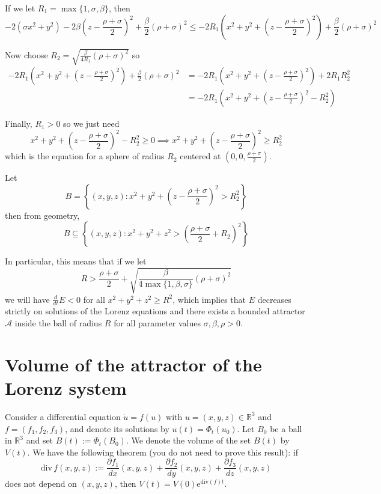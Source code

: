 \documentclass[12pt]{article}
\newcommand{\R}{\mathbb{R}}
\newcommand{\sub}{\subseteq}
\begin{document}
If we let $R_1 = \max\{1, \sigma, \beta\}$, then
\[-2(\sigma x^2 + y^2) -2\beta \left(z - \frac{\rho +\sigma}{2}\right)^2 + \frac{\beta}{2}(\rho + \sigma)^2 \leq -2R_1\left(x^2 + y^2 + \left(z - \frac{\rho +\sigma}{2}\right)^2\right) + \frac{\beta}{2}(\rho + \sigma)^2\]

Now choose $R_2 = \sqrt{\frac{\beta}{4R_1}(\rho + \sigma)^2}$ so
\begin{align*}
    -2R_1\left(x^2 + y^2 + \left(z - \frac{\rho +\sigma}{2}\right)^2\right) + \frac{\beta}{2}(\rho + \sigma)^2 & = -2R_1\left(x^2 + y^2 + \left(z - \frac{\rho +\sigma}{2}\right)^2\right) + 2R_1 R_2^2 \\
                                                                                                               & = -2R_1\left(x^2 + y^2 + \left(z - \frac{\rho +\sigma}{2}\right)^2 - R_2^2\right)
\end{align*}

Finally, $R_1 > 0$ so we just need
\[x^2 + y^2 + \left(z - \frac{\rho +\sigma}{2}\right)^2 - R_2^2 \geq 0 \implies x^2 + y^2 + \left(z - \frac{\rho +\sigma}{2}\right)^2 \geq R_2^2 \]
which is the equation for a sphere of radius $R_2$ centered at $(0, 0, \frac{\rho +\sigma}{2})$.

Let
\[B = \left\{(x, y, z):  x^2 + y^2 + \left(z - \frac{\rho +\sigma}{2}\right)^2 > R_2^2 \right\}\]
then from geometry,
\[B \sub \left\{(x, y, z): x^2 + y^2 + z^2 >\left(\frac{\rho +\sigma}{2} + R_2\right)^2\right\}\]

In particular, this means that if we let
\[\boxed{R > \frac{\rho + \sigma}{2}+ \sqrt{\frac{\beta}{4\max\{1, \beta, \sigma\}}(\rho + \sigma)^2}}\]
we will have $\frac{d}{dt}E < 0$ for all $x^2 + y^2 + z^2 \geq R^2$, which implies that $E$ decreases strictly on solutions of the Lorenz equations and there exists a bounded attractor $\mathcal{A}$ inside the ball of radius $R$ for all parameter values $\sigma, \beta, \rho > 0$.
\color{black}

\pagebreak


\section{Volume of the attractor of the Lorenz system}

Consider a differential equation $\dot{u}=f(u)$ with $u=(x,y,z)\in\R^3$ and $f=(f_1,f_2,f_3)$, and denote its solutions by $u(t)=\Phi_t(u_0)$. Let $B_0$ be a ball in $\R^3$ and set $B(t):=\Phi_t(B_0)$. We denote the volume of the set $B(t)$ by $V(t)$. We have the following theorem (you do not need to prove this result): if
\[
    \mathrm{div}\, f(x,y,z) := \frac{\partial f_1}{d x}(x,y,z) + \frac{\partial f_2}{d y}(x,y,z) + \frac{\partial f_3}{d z}(x,y,z)
\]
does not depend on $(x,y,z)$, then $V(t)=V(0)\mathrm{e}^{\mathrm{div}(f)t}$.
\end{document}
